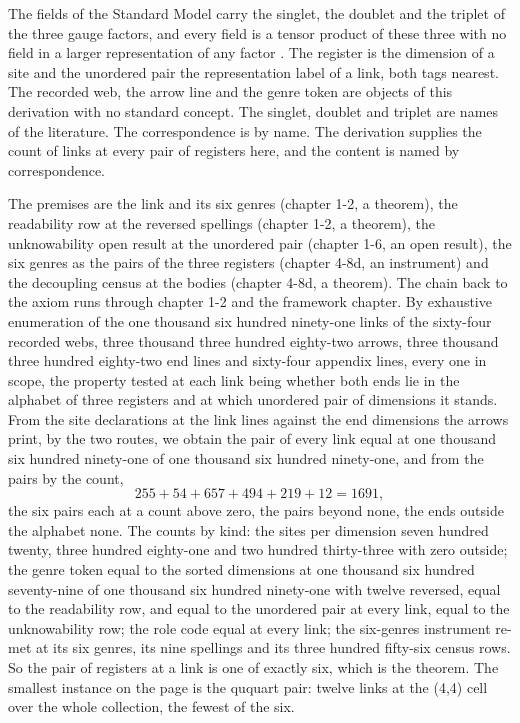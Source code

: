 \begin{chbridge}
The fields of the Standard Model carry the singlet, the doublet and the triplet of the three gauge factors, and every field is a tensor product of these three with no field in a larger representation of any factor \cite{Glashow1961,GeorgiGlashow1974}.
The register is the dimension of a site and the unordered pair the representation label of a link, both tags nearest. The recorded web, the arrow line and the genre token are objects of this derivation with no standard concept. The singlet, doublet and triplet are names of the literature. The correspondence is by name. The derivation supplies the count of links at every pair of registers here, and the content is named by correspondence.
\end{chbridge}
\begin{chproof}
The premises are the link and its six genres (chapter 1-2, a theorem), the readability row at the reversed spellings (chapter 1-2, a theorem), the unknowability open result at the unordered pair (chapter 1-6, an open result), the six genres as the pairs of the three registers (chapter 4-8d, an instrument) and the decoupling census at the bodies (chapter 4-8d, a theorem). The chain back to the axiom runs through chapter 1-2 and the framework chapter. By exhaustive enumeration of the one thousand six hundred ninety-one links of the sixty-four recorded webs, three thousand three hundred eighty-two arrows, three thousand three hundred eighty-two end lines and sixty-four appendix lines, every one in scope, the property tested at each link being whether both ends lie in the alphabet of three registers and at which unordered pair of dimensions it stands. From the site declarations at the link lines against the end dimensions the arrows print, by the two routes, we obtain the pair of every link equal at one thousand six hundred ninety-one of one thousand six hundred ninety-one, and from the pairs by the count,
\begin{equation}
255 + 54 + 657 + 494 + 219 + 12 = 1691 ,
\end{equation}
the six pairs each at a count above zero, the pairs beyond none, the ends outside the alphabet none. The counts by kind: the sites per dimension seven hundred twenty, three hundred eighty-one and two hundred thirty-three with zero outside; the genre token equal to the sorted dimensions at one thousand six hundred seventy-nine of one thousand six hundred ninety-one with twelve reversed, equal to the readability row, and equal to the unordered pair at every link, equal to the unknowability row; the role code equal at every link; the six-genres instrument re-met at its six genres, its nine spellings and its three hundred fifty-six census rows. So the pair of registers at a link is one of exactly six, which is the theorem. The smallest instance on the page is the ququart pair: twelve links at the (4,4) cell over the whole collection, the fewest of the six.


\end{chproof}
